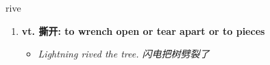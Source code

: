 
\begin{frame}
{\huge rive}
\begin{center}
\begin{enumerate}\Large
  \item \textbf{vt. 撕开: to wrench open or tear apart or to pieces}
  \begin{itemize}
    \item \em{\Large{Lightning rived the tree. 闪电把树劈裂了}}
  \end{itemize}
\end{enumerate}
\end{center}
\end{frame}
